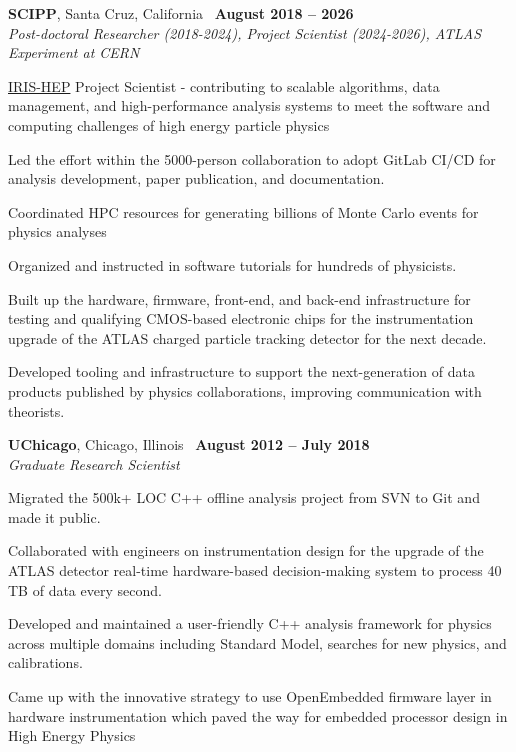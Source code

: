 \documentclass[margin,line]{resume}
\begin{document}
\begin{resume}
\textbf{SCIPP}, Santa Cruz, California \hfill \faCalendar\ \textbf{August 2018 -- 2026}\\
\textsl{Post-doctoral Researcher (2018-2024), Project Scientist (2024-2026), ATLAS Experiment at CERN}
\begin{list2}
  \small
\item \href{https://iris-hep.org}{IRIS-HEP} Project Scientist - contributing to scalable algorithms, data management, and high-performance analysis systems to meet the software and computing challenges of high energy particle physics
  \item Led the effort within the 5000-person collaboration to adopt GitLab CI/CD for analysis development, paper publication, and documentation.
  \item Coordinated HPC resources for generating billions of Monte Carlo events for physics analyses
  \item Organized and instructed in software tutorials for hundreds of physicists.
  \item Built up the hardware, firmware, front-end, and back-end infrastructure for testing and qualifying CMOS-based electronic chips for the instrumentation upgrade of the ATLAS charged particle tracking detector for the next decade.
  \item Developed tooling and infrastructure to support the next-generation of data products published by physics collaborations, improving communication with theorists.
\end{list2}

\textbf{UChicago}, Chicago, Illinois \hfill \faCalendar\ \textbf{August 2012 -- July 2018}\\
\textsl{Graduate Research Scientist}
\begin{list2}
  \small
  \item Migrated the 500k+ LOC C++ offline analysis project from SVN to Git and made it public.
  \item Collaborated with engineers on instrumentation design for the upgrade of the ATLAS detector real-time hardware-based decision-making system to process 40 TB of data every second.
  \item Developed and maintained a user-friendly C++ analysis framework for physics across multiple domains including Standard Model, searches for new physics, and calibrations.
  \item Came up with the innovative strategy to use OpenEmbedded firmware layer in hardware instrumentation which paved the way for embedded processor design in High Energy Physics
\end{list2}


\end{resume}
\end{document}
